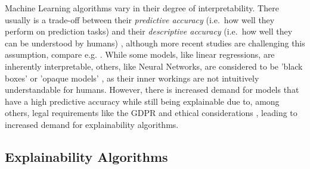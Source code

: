 Machine Learning algorithms vary in their degree of interpretability. There usually is a trade-off between their \textit{predictive accuracy} (i.e.\ how well they perform on prediction tasks) and their \textit{descriptive accuracy} (i.e.\ how well they can be understood by humans) \parencite{Murdoch2019}, although more recent studies are challenging this assumption, compare e.g. \cite{Cooper2024}.
While some models, like linear regressions, are inherently interpretable, others, like Neural Networks, are considered to be 'black boxes' \parencite{Guidotti2018} or 'opaque models' \parencite{Burrell2016}, as their inner workings are not intuitively understandable for humans.
However, there is increased demand for models that have a high predictive accuracy while still being explainable due to, among others, legal requirements like the GDPR \parencite{GDPR} and ethical considerations \parencite{Guidotti2018}, leading to increased demand for explainability algorithms.

\subsection{Explainability Algorithms}\label{subsec:algorithms}

